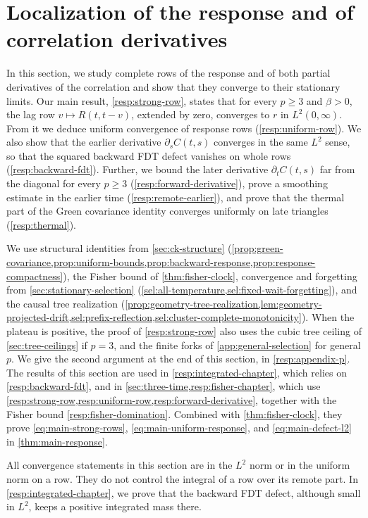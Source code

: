 \chapter{Localization of the response and of correlation derivatives}\label{resp:chapter}

In this section, we study complete rows of the response and of both partial derivatives of the correlation and show that they converge to their stationary limits. Our main result, \cref{resp:strong-row}, states that for every $p\ge3$ and $\beta>0$, the lag row $v\mapsto R(t,t-v)$, extended by zero, converges to $r$ in $L^2(0,\infty)$. From it we deduce uniform convergence of response rows (\cref{resp:uniform-row}). We also show that the earlier derivative $\partial_sC(t,s)$ converges in the same $L^2$ sense, so that the squared backward FDT defect vanishes on whole rows (\cref{resp:backward-fdt}). Further, we bound the later derivative $\partial_tC(t,s)$ far from the diagonal for every $p\ge3$ (\cref{resp:forward-derivative}), prove a smoothing estimate in the earlier time (\cref{resp:remote-earlier}), and prove that the thermal part of the Green covariance identity converges uniformly on late triangles (\cref{resp:thermal}).

We use structural identities from \cref{sec:ck-structure} (\cref{prop:green-covariance,prop:uniform-bounds,prop:backward-response,prop:response-compactness}), the Fisher bound of \cref{thm:fisher-clock}, convergence and forgetting from \cref{sec:stationary-selection} (\cref{sel:all-temperature,sel:fixed-wait-forgetting}), and the causal tree realization (\cref{prop:geometry-tree-realization,lem:geometry-projected-drift,sel:prefix-reflection,sel:cluster-complete-monotonicity}). When the plateau is positive, the proof of \cref{resp:strong-row} also uses the cubic tree ceiling of \cref{sec:tree-ceilings} if $p=3$, and the finite forks of \cref{app:general-selection} for general $p$. We give the second argument at the end of this section, in \cref{resp:appendix-p}. The results of this section are used in \cref{resp:integrated-chapter}, which relies on \cref{resp:backward-fdt}, and in \cref{sec:three-time,resp:fisher-chapter}, which use \cref{resp:strong-row,resp:uniform-row,resp:forward-derivative}, together with the Fisher bound \eqref{resp:fisher-domination}. Combined with \cref{thm:fisher-clock}, they prove \eqref{eq:main-strong-rows}, \eqref{eq:main-uniform-response}, and \eqref{eq:main-defect-l2} in \cref{thm:main-response}.

All convergence statements in this section are in the $L^2$ norm or in the uniform norm on a row. They do not control the integral of a row over its remote part. In \cref{resp:integrated-chapter}, we prove that the backward FDT defect, although small in $L^2$, keeps a positive integrated mass there.

